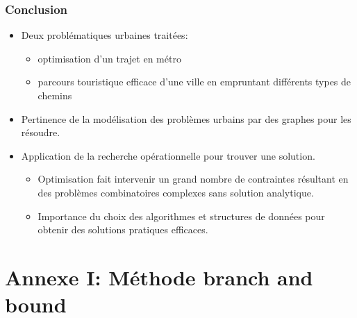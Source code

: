 \documentclass[10pt]{beamer}
\begin{document}
\begin{frame}
\frametitle{Conclusion}
\begin{itemize}
\item Deux problématiques urbaines traitées: 
  \begin{itemize}
  \item optimisation d'un trajet en métro
  \item parcours touristique efficace d'une ville en empruntant différents types de chemins
  \end{itemize}
\item Pertinence de la modélisation des problèmes urbains par des graphes pour les résoudre.
\item Application de la recherche opérationnelle pour trouver une solution.
  \begin{itemize}
  \item Optimisation fait intervenir un grand nombre de contraintes
résultant en des problèmes combinatoires complexes sans solution analytique.
  \item Importance du choix des algorithmes et structures de données pour obtenir des solutions pratiques efficaces.
  \end{itemize}
\end{itemize}
\end{frame}

\section{Annexe I: Méthode branch and bound}
\end{document}
